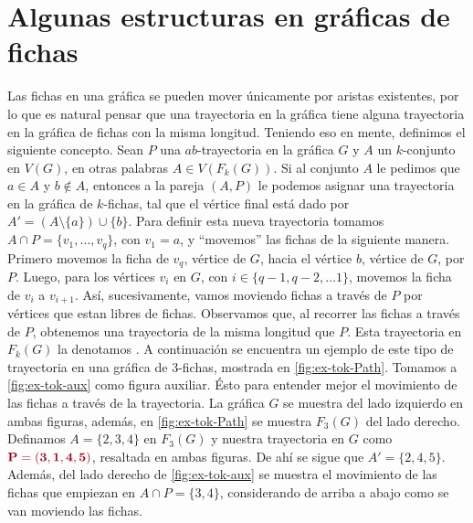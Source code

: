 \section{Algunas estructuras en gr\'aficas de fichas}%
\label{sec:}

Las fichas en una gr\'afica se pueden mover \'unicamente por aristas existentes,
por lo que es natural pensar que una trayectoria en la gr\'afica tiene alguna
trayectoria en la gr\'afica de fichas con la misma longitud. Teniendo eso en
mente, definimos el siguiente concepto. Sean $P$ una $ab$-trayectoria en la
gr\'afica $G$ y $A$ un $k$-conjunto en $V(G)$, en otras palabras $A \in
V(F_k(G))$. Si al conjunto $A$ le pedimos que $a\in A$ y $b \notin A$, entonces
a la pareja $(A,P)$ le podemos asignar una trayectoria en la gr\'afica de
$k$-fichas, tal que el v\'ertice final est\'a dado por $A'=(A \setminus \{a\})
\cup \{b\}$. Para definir esta nueva trayectoria tomamos $A\cap P =\{v_1, \dots,
v_q\}$, con $v_1 = a$, y ``movemos'' las fichas de la siguiente manera. Primero
movemos la ficha de $v_q$, v\'ertice de $G$, hacia el v\'ertice $b$, v\'ertice
de $G$, por $P$. Luego, para los v\'ertices $v_i$ en $G$, con $i \in \{q-1, q-2,
\dots 1\}$, movemos la ficha de $v_i$ a $v_{i+1}$. As\'i, sucesivamente, vamos
moviendo fichas a trav\'es de $P$ por v\'ertices que estan libres de fichas.
Observamos que, al recorrer las fichas a trav\'es de $P$, obtenemos una
trayectoria de la misma longitud que $P$. Esta trayectoria en $F_k(G)$ la
denotamos . A continuaci\'on se
encuentra un ejemplo de este tipo de trayectoria en una gr\'afica de $3$-fichas,
mostrada en \cref{fig:ex-tok-Path}. Tomamos a \cref{fig:ex-tok-aux} como figura
auxiliar. \'Esto para entender mejor el movimiento de las fichas a trav\'es de
la trayectoria. La gr\'afica $G$ se muestra del lado izquierdo en ambas figuras,
adem\'as, en \cref{fig:ex-tok-Path} se muestra $F_3(G)$ del lado derecho.
Definamos $A=\{2,3,4\}$ en $F_3(G)$ y nuestra trayectoria en $G$ como
${\color{vino}\bf P= (3,1,4,5)}$, resaltada en ambas figuras. De ah\'i se sigue
que $A'=\{2,4,5\}$. Adem\'as, del lado derecho de \cref{fig:ex-tok-aux} se
muestra el movimiento de las fichas que empiezan en $A \cap P =\{3,4\}$,
considerando de arriba a abajo como se van moviendo las fichas.

